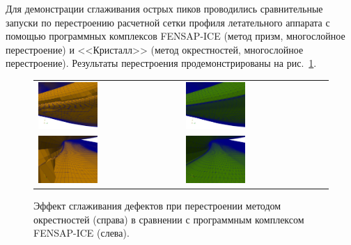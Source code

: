 Для демонстрации сглаживания острых пиков проводились сравнительные запуски по перестроению расчетной сетки профиля летательного аппарата с помощью программных комплексов FENSAP-ICE (метод призм, многослойное перестроение) и <<Кристалл>> (метод окрестностей, многослойное перестроение).
Результаты перестроения продемонстрированы на рис.~\ref{fig:text_1_remesh3_with_fensap}.

\begin{figure}[!ht]
\centering
\begin{tabular}{ll}
\includegraphics[width=0.43\textwidth]{fig/3dr_fens1.png}
&
\includegraphics[width=0.43\textwidth]{fig/3dr_crys1.png} \\
\includegraphics[width=0.43\textwidth]{fig/3dr_fens2.png}
&
\includegraphics[width=0.43\textwidth]{fig/3dr_crys2.png}
\end{tabular}
\singlespacing
\caption{Эффект сглаживания дефектов при перестроении методом окрестностей (справа) в сравнении с программным комплексом FENSAP-ICE (слева).}
\label{fig:text_1_remesh3_with_fensap}
\end{figure}

